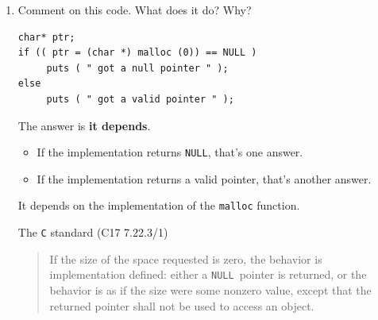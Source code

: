 \documentclass[12pt]{article}
\newcommand{\NULL}{{\texttt{NULL}}}%
\begin{document}
\begin{enumerate}
\begin{itemize}
\begin{itemize}
\begin{itemize}
\item The C programming language manages memory statically, automatically, or dynamically. 
\item Static-duration variables are allocated in main memory, usually along with the executable code of the program, and persist for the lifetime of the program
\item Automatic-duration variables are allocated on the stack and come and go as functions are called and return.
\item For static-duration and automatic-duration variables, the size of the allocation must be compile-time constant (except for the case of variable-length automatic arrays).
\item Dynamic memory allocation-- memory more explicitly (but more flexibly) managed, typically by allocating it from the free store (informally called the "heap"), an area of memory structured for this purpose.
\end{itemize}
\end{itemize}

So this is where we are left.    In C and for the most part embedded software probably is
developed in C, this point of the Stack, Heap (free-store) is worth discussing with the
candidate and the more they talk about it, the more you will get a sense of their background
facing challenges.

\end{itemize}

\item Comment on this code.  What does it do?  Why?

\begin{lstlisting}
char* ptr;
if (( ptr = (char *) malloc (0)) == NULL )
     puts ( " got a null pointer " );
else
     puts ( " got a valid pointer " );
\end{lstlisting} 

The answer is {\textbf{it depends}}.

\begin{itemize}
\item If the implementation returns \NULL, that's one answer.
\item If the implementation returns a valid pointer, that's another answer.
\end{itemize}

It depends on the implementation of the {\texttt{malloc}} function.

The {\texttt{C}} standard (C17 7.22.3/1)\par
\begin{quote}
If the size of the space requested is zero, the behavior is implementation defined: either a \NULL\ pointer is returned, or the behavior is as if the size were some nonzero value, except that the returned pointer shall not be used to access an object.
\end{quote}


\end{enumerate}
\end{document}
